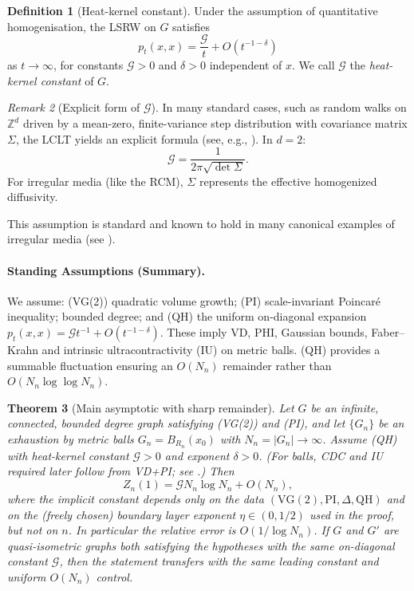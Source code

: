 \documentclass{article}
\numberwithin{equation}{section}
\newtheorem{theorem}{Theorem}[section]
\theoremstyle{definition}
\newtheorem{definition}[theorem]{Definition}
\theoremstyle{remark}
\newtheorem{remark}[theorem]{Remark}
\newcommand{\cG}{\mathcal{G}}
\begin{document}
\begin{definition}[Heat-kernel constant]\label{def:G}
Under the assumption of quantitative homogenisation, the LSRW on $G$ satisfies
\[
  p_t(x,x)=\frac{\cG}{t}+O(t^{-1-\delta})
\]
as $t\to\infty$, for constants $\cG>0$ and $\delta>0$ independent of $x$. We call $\cG$ the \emph{heat-kernel constant} of $G$.
\end{definition}

\begin{remark}[Explicit form of $\cG$]\label{rem:G_formula}
In many standard cases, such as random walks on $\mathbb{Z}^d$ driven by a mean-zero, finite-variance step distribution with covariance matrix $\Sigma$, the LCLT yields an explicit formula (see, e.g., \cite[Ch. 2]{LawlerLimic10}). In $d=2$:
\[
\cG = \frac{1}{2\pi\sqrt{\det\Sigma}}.
\]
For irregular media (like the RCM), $\Sigma$ represents the effective homogenized diffusivity.
\end{remark}

This assumption is standard and known to hold in many canonical examples of irregular media (see ).
\paragraph{Standing Assumptions (Summary).} We assume: (VG(2)) quadratic volume growth; (PI) scale-invariant Poincaré inequality; bounded degree; and (QH) the uniform on-diagonal expansion $p_t(x,x)=\cG t^{-1}+O(t^{-1-\delta})$. These imply VD, PHI, Gaussian bounds, Faber--Krahn and intrinsic ultracontractivity (IU) on metric balls. (QH) provides a summable fluctuation ensuring an $O(N_n)$ remainder rather than $O(N_n\log\log N_n)$.

\begin{theorem}[Main asymptotic with sharp remainder]\label{thm:main}
Let $G$ be an infinite, connected, bounded degree graph satisfying (VG(2)) and (PI), and let $\{G_n\}$ be an exhaustion by metric balls $G_n=B_{R_n}(x_0)$ with $N_n=|G_n|\to\infty$. Assume (QH) with heat-kernel constant $\cG>0$ and exponent $\delta>0$. (For balls, CDC and IU required later follow from VD+PI; see .) Then
\[
  Z_n(1)= \cG N_n \log N_n + O(N_n),
\]
where the implicit constant depends only on the data $(\mathrm{VG(2)},\mathrm{PI},\Delta,\mathrm{QH})$ and on the (freely chosen) boundary layer exponent $\eta\in(0,1/2)$ used in the proof, but not on $n$. In particular the relative error is $O(1/\log N_n)$. If $G$ and $G'$ are quasi-isometric graphs both satisfying the hypotheses with the \emph{same} on-diagonal constant $\cG$, then the statement transfers with the same leading constant and uniform $O(N_n)$ control.
\end{theorem}
\end{document}
